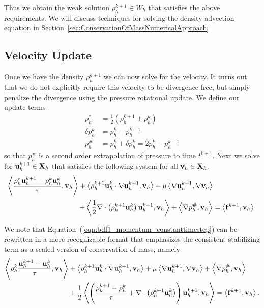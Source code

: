 \documentclass[letterpaper]{erdc}
\begin{document}
Thus we obtain the weak solution $\rho_h^{k+1}\in W_h$ that satisfies the above requirements.  We will discuss techniques for solving the density advection equation in Section~\ref{sec:ConservationOfMassNumericalApproach}

%
%
\subsection{Velocity Update}
Once we have the density $\rho_h^{k+1}$ we can now solve for the velocity.  It turns out that we do not explicitly require this velocity to be divergence free, but simply penalize the divergence using the pressure rotational update.  We define our update terms
\begin{align*}
  \rho_h^{*} &= \frac{1}{2}\left( \rho_h^{k+1} + \rho_h^{k} \right)\\
  \delta p_h^{k} &= p_h^{k} - p_h^{k-1}\\
    p_h^{\#} &= p_h^{k} + \delta p_h^{k} = 2p_h^{k} - p_h^{k-1}
\end{align*}
so that $p_h^{\#}$ is a second order extrapolation of pressure to time $t^{k+1}$.  Next we  solve for $\textbf{u}_h^{k+1}\in\textbf{X}_h$ that satisfies the following system for all $\textbf{v}_h\in\textbf{X}_h$,
\begin{equation}\label{eqn:bdf1_momentum_constanttimestep}
  \begin{split}
\left\langle  \frac{\rho_h^{*}\textbf{u}_h^{k+1}-\rho_h^{k}\textbf{u}_h^{k} }{\tau} , \textbf{v}_h \right\rangle + \left\langle  \rho_h^{k+1}\textbf{u}_h^{k}\cdot\nabla\textbf{u}_h^{k+1} , \textbf{v}_h \right\rangle+ \mu\left\langle  \nabla \textbf{u}_h^{k+1} , \nabla\textbf{v}_h \right\rangle&\\
 + \left\langle  \frac{1}{2}\nabla\cdot\left(\rho_h^{k+1}\textbf{u}_h^{k}\right)\textbf{u}_h^{k+1} , \textbf{v}_h \right\rangle +\left\langle \nabla p_h^{\#}, \textbf{v}_h \right\rangle &= \left\langle \mathbf{f}^{k+1}, \textbf{v}_h \right\rangle.
\end{split}
\end{equation}

We note that Equation~(\ref{eqn:bdf1_momentum_constanttimestep}) can be rewritten in a more recognizable format that emphasizes the consistent stabilizing term as a scaled version of conservation of mass, namely
\begin{equation}\label{eqn:bdf1morerecognizableform}
  \begin{split}
\left\langle \rho_h^{k} \frac{\textbf{u}_h^{k+1}-\textbf{u}_h^{k} }{\tau} , \textbf{v}_h \right\rangle &+ \left\langle  \rho_h^{k+1}\textbf{u}_h^{k}\cdot\nabla\textbf{u}_h^{k+1} , \textbf{v}_h \right\rangle + \mu\left\langle  \nabla \textbf{u}_h^{k+1} , \nabla\textbf{v}_h \right\rangle+\left\langle \nabla p_h^{\#}, \textbf{v}_h \right\rangle\\
 &+ \frac{1}{2}\left\langle  \left(\frac{\rho_h^{k+1} - \rho_h^{k}}{\tau} + \nabla\cdot\left(\rho_h^{k+1}\textbf{u}_h^{k}\right)  \right )\textbf{u}_h^{k+1} , \textbf{v}_h \right\rangle = \left\langle \mathbf{f}^{k+1}, \textbf{v}_h \right\rangle.
\end{split}
\end{equation}
\end{document}
